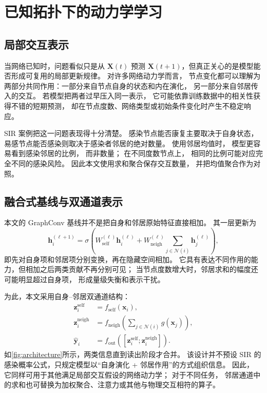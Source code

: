 \section{已知拓扑下的动力学学习}

\subsection{局部交互表示}

当网络已知时，问题看似只是从 $\mathbf X(t)$ 预测 $\mathbf X(t+1)$，但真正关心的是模型能否形成可复用的局部更新规律。
对许多网络动力学而言，
节点变化都可以理解为两部分共同作用：一部分来自节点自身的状态和内在演化，
另一部分来自邻居传入的交互。
若模型把两者过早压入同一表示，
它可能依靠训练数据中的相关性获得不错的短期预测，
却在节点度数、网络类型或初始条件变化时产生不稳定响应。

SIR 案例把这一问题表现得十分清楚。
感染节点能否康复主要取决于自身状态，易感节点能否感染则取决于感染者邻居的绝对数量。
使用邻居均值时，
模型更容易看到感染邻居的比例，
而非数量；
在不同度数节点上，
相同的比例可能对应完全不同的感染风险。
因此本文使用求和聚合保存交互数量，
并把均值聚合作为对照。

\subsection{融合式基线与双通道表示}

本文的 GraphConv 基线并不是把自身和邻居原始特征直接相加。
其一层更新为
\begin{equation}
\mathbf h_i^{(\ell+1)}=\sigma\!\left(
W_{\mathrm{self}}^{(\ell)}\mathbf h_i^{(\ell)}
+W_{\mathrm{neigh}}^{(\ell)}
\sum_{j\in\mathcal N(i)}\mathbf h_j^{(\ell)}
\right),
\label{eq:graphconv}
\end{equation}
即先对自身项和邻居项分别变换，再在隐藏空间相加。
它具有表达不同作用的能力，但相加之后两类贡献不再分别可见；
当节点度数增大时，邻居求和的幅度还可能明显超过自身项，
形成量级失衡和表示干扰。

为此，本文采用自身--邻居双通道结构：
\begin{align}
\mathbf z_i^{\mathrm{self}}&=f_{\mathrm{self}}(\mathbf x_i),\\
\mathbf z_i^{\mathrm{neigh}}&=
f_{\mathrm{neigh}}\!\left(\sum_{j\in\mathcal N(i)}g(\mathbf x_j)\right),\\
\hat{\mathbf y}_i&=f_{\mathrm{out}}\!
\left([\mathbf z_i^{\mathrm{self}};\mathbf z_i^{\mathrm{neigh}}]\right).
\end{align}
如\cref{fig:architecture}所示，两类信息直到读出阶段才合并。
该设计并不预设 SIR 的感染概率公式，只规定模型以“自身演化 + 邻居作用”的方式组织信息。
因此，
它同样可用于其他满足局部交互假设的网络动力学；
对于不同任务，
邻居通道中的求和也可替换为加权聚合、注意力或其他与物理交互相符的算子。

